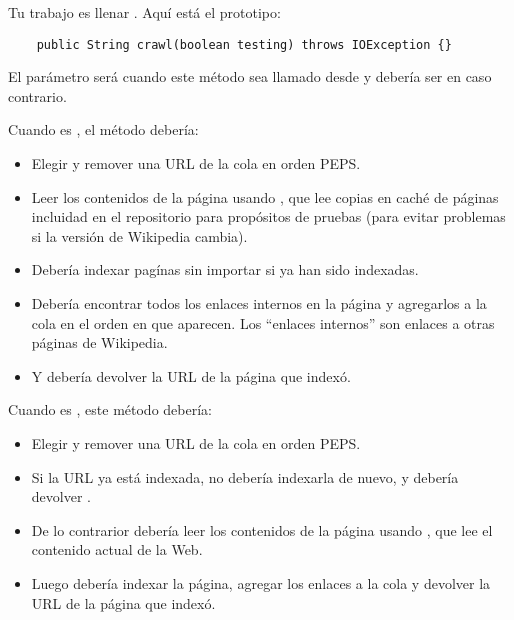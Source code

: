 \documentclass[12pt]{book}
\theoremstyle{exercise}
\begin{document}
Tu trabajo es llenar . Aquí está el prototipo:


\begin{verbatim}
    public String crawl(boolean testing) throws IOException {}
\end{verbatim}

El parámetro  será  cuando este método sea
llamado desde  y debería ser 
en caso contrario.

Cuando  es , el método  debería:

\begin{itemize}

\item
  Elegir y remover una URL de la cola en orden PEPS.

\item
  Leer los contenidos de la página usando
  , que lee copias en caché de páginas
  incluidad en el repositorio para propósitos de pruebas (para evitar
  problemas si la versión de Wikipedia cambia).

\item
  Debería indexar pagínas sin importar si ya han sido indexadas.

\item
  Debería encontrar todos los enlaces internos en la página y agregarlos a la
  cola en el orden en que aparecen. Los ``enlaces internos'' son enlaces
  a otras páginas de Wikipedia.

\item
  Y debería devolver la URL de la página que indexó.

\end{itemize}

Cuando  es , este método debería:

\begin{itemize}

\item
  Elegir y remover una URL de la cola en orden PEPS.

\item
  Si la URL ya está indexada, no debería indexarla de nuevo, y
  debería devolver .

\item
  De lo contrarior debería leer los contenidos de la página usando
  , que lee el contenido actual de
  la Web.

\item
  Luego debería indexar la página, agregar los enlaces a la cola y devolver
  la URL de la página que indexó.

\end{itemize}
\end{document}
